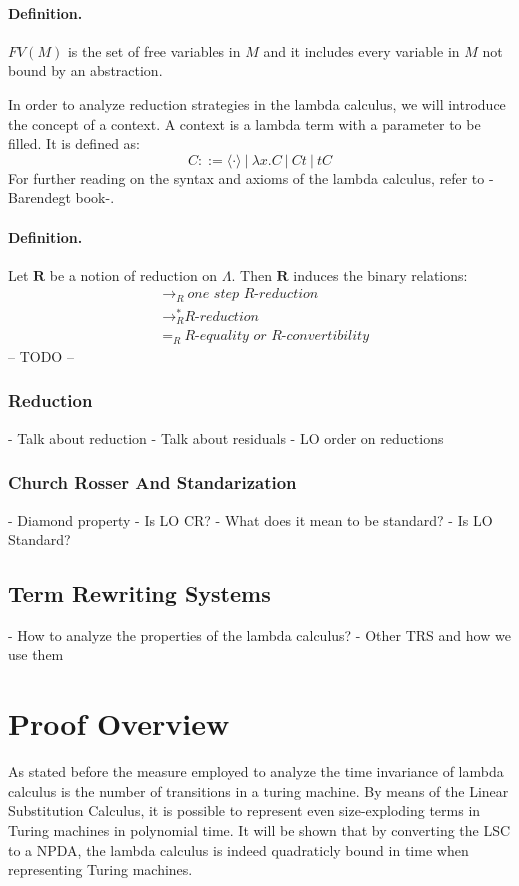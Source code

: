 \documentclass[12pt]{article}
\begin{document}
\paragraph{Definition.} $FV(M)$ is the set of free variables in $M$ and it includes every variable in $M$ not bound by an abstraction.

In order to analyze reduction strategies in the lambda calculus, we will introduce the concept of a context. A context is a lambda term with a parameter to be filled. It is defined as:
\begin{equation}
C ::= \langle \cdot \rangle \ | \ \lambda x.C \ | \ Ct \ | \ tC
\end{equation}
For further reading on the syntax and axioms of the lambda calculus, refer to -Barendegt book-.

\paragraph{Definition.} Let $\textbf{R}$ be a notion of reduction on $\Lambda$. Then $\textbf{R}$ induces the binary relations:
\begin{equation}
  \begin{split}
          &{\rightarrow}_{R} \ \textit{one step R-reduction} \\
          &\rightarrow_{R}^{*} \textit{R-reduction} \\
          &=_{R} \ \textit{R-equality or R-convertibility}
  \end{split}
\end{equation}
-- TODO --

\subsubsection{Reduction}
- Talk about reduction
- Talk about residuals
- LO order on reductions
\subsubsection{Church Rosser And Standarization}
- Diamond property - Is LO CR?
- What does it mean to be standard? - Is LO Standard?
\subsection{Term Rewriting Systems}
- How to analyze the properties of the lambda calculus?
- Other TRS and how we use them
\section{Proof Overview}
As stated before the measure employed to analyze the time invariance of lambda calculus is the number of transitions in a turing machine. By means of the Linear Substitution Calculus, it is possible to represent even size-exploding terms in Turing machines in polynomial time. It will be shown that by converting the LSC to a NPDA, the lambda calculus is indeed quadraticly bound in time when representing Turing machines.
\end{document}

